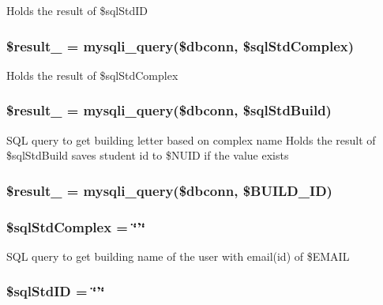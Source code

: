 \-Holds the result of \$sql\-Std\-I\-D \hypertarget{studentForm_8php_a07f852a7360d1ebc1bf4cd3656067b66}{
\subsubsection[{\$result\-\_\-7}]{\setlength{\rightskip}{0pt plus 5cm}\$result\-\_ = mysqli\-\_\-query(\$dbconn, \$sql\-Std\-Complex)}}\label{studentForm_8php_a07f852a7360d1ebc1bf4cd3656067b66}
\-Holds the result of \$sql\-Std\-Complex \hypertarget{studentForm_8php_a357d2b02bfc3b7772c72f22aa687fd14}{
\subsubsection[{\$result\-\_\-8}]{\setlength{\rightskip}{0pt plus 5cm}\$result\-\_ = mysqli\-\_\-query(\$dbconn, \$sql\-Std\-Build)}}\label{studentForm_8php_a357d2b02bfc3b7772c72f22aa687fd14}
\-S\-Q\-L query to get building letter based on complex name \-Holds the result of \$sql\-Std\-Build saves student id to \$\-N\-U\-I\-D if the value exists\hypertarget{studentForm_8php_a0b3f63d6f969a6ad92963ceae90afab9}{
\subsubsection[{\$result\-\_\-9}]{\setlength{\rightskip}{0pt plus 5cm}\$result\-\_ = mysqli\-\_\-query(\$dbconn, \$\-B\-U\-I\-L\-D\-\_\-\-I\-D)}}\label{studentForm_8php_a0b3f63d6f969a6ad92963ceae90afab9}
\hypertarget{studentForm_8php_adb86f6e2c816e38e375c8c73aab83c39}{
\subsubsection[{\$sql\-Std\-Complex}]{\setlength{\rightskip}{0pt plus 5cm}\$sql\-Std\-Complex = \char`\"{}'\char`\"{}}}\label{studentForm_8php_adb86f6e2c816e38e375c8c73aab83c39}
\-S\-Q\-L query to get building name of the user with email(id) of \$\-E\-M\-A\-I\-L \hypertarget{studentForm_8php_a46b1581b0b49ddd7427714321fc5a641}{
\subsubsection[{\$sql\-Std\-I\-D}]{\setlength{\rightskip}{0pt plus 5cm}\$sql\-Std\-I\-D = \char`\"{}'\char`\"{}}}\label{studentForm_8php_a46b1581b0b49ddd7427714321fc5a641}
